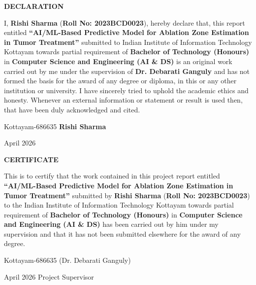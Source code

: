 \documentclass[12pt,a4wide]{report}
\theoremstyle{plain}
\theoremstyle{definition}
\theoremstyle{remark}
\begin{document}
\clearpage
 \setcounter{page}{2}
\begin{center}
{\large{\bf{DECLARATION}}}
\end{center}


\noindent I, \textbf{Rishi Sharma} (\textbf{Roll No: 2023BCD0023}), hereby declare that, this report entitled
\textbf{``AI/ML-Based Predictive Model for Ablation Zone Estimation in Tumor Treatment''} submitted to Indian
Institute of Information Technology Kottayam towards partial
requirement of {\bf Bachelor of Technology (Honours)} in \textbf{Computer Science and Engineering (AI \& DS)}
is an original work carried out by me under the supervision of
\textbf{Dr. Debarati Ganguly} and has not formed the basis for the award
of any degree or diploma, in this or any other institution or
university. I have sincerely tried to uphold the academic ethics
and honesty. Whenever an external information or statement or
result is used then, that have been duly acknowledged and cited.

\vspace{4cm}

\noindent Kottayam-686635 \hfill \textbf{Rishi Sharma}

\noindent April  2026

\clearpage


 \setcounter{page}{3}
\begin{center}
{\large{\bf{CERTIFICATE}}}
\end{center}


\noindent This is to certify that the work contained in this
project report entitled \textbf{``AI/ML-Based Predictive Model for Ablation Zone Estimation in Tumor Treatment''}
submitted by \textbf{Rishi Sharma} (\textbf{Roll No: 2023BCD0023}) to the Indian Institute of Information Technology Kottayam
towards partial requirement of {\bf Bachelor of Technology (Honours)} in
\textbf{Computer Science and Engineering (AI \& DS)} has been carried out by him under my
supervision and that it has not been submitted elsewhere for the
award of any degree.


\vspace{4cm}

\noindent Kottayam-686635  \hfill (Dr. Debarati Ganguly)

\noindent April  2026 \hfill Project Supervisor
\end{document}
